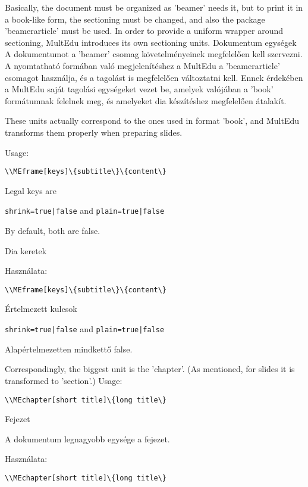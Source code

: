 



{
Basically, the document must be organized as 'beamer' needs it,
but to print it in a book-like form, the sectioning must be changed,
and also the package 'beamerarticle' must be used.
In order to provide a uniform wrapper around sectioning, MultEdu introduces
its own sectioning units.
}
{Dokumentum egységek}
{
A dokumentumot a 'beamer' csomag követelményeinek megfelelően kell szervezni.
A nyomtatható formában való megjelenítéshez a MultEdu  a 'beamerarticle' csomagot használja,
és a tagolást is megfelelően változtatni kell.
Ennek érdekében a MultEdu saját tagolási egységeket vezet be, amelyek valójában
a 'book' formátumnak felelnek meg, és amelyeket dia készítéshez megfelelően átalakít.
}

{
These units actually correspond to the ones used in format 'book',
and MultEdu transforms them properly when preparing slides.

Usage:\par
\noindent\lstinline|\\MEframe[keys]\{subtitle\}\{content\}|

Legal keys are 

\noindent\lstinline!shrink=true|false! and \lstinline!plain=true|false!

By default, both are false.
}
{Dia keretek}
{

Használata:\par
\noindent\lstinline|\\MEframe[keys]\{subtitle\}\{content\}|

Értelmezett kulcsok 

\noindent\lstinline!shrink=true|false! and \lstinline!plain=true|false!

Alapértelmezetten mindkettő false.
}


{
Correspondingly, the biggest unit is the 'chapter'.
(As mentioned, for slides it is transformed to 'section'.)
Usage:\par
\noindent\lstinline|\\MEchapter[short title]\{long title\}|

}
{Fejezet}
{

A dokumentum legnagyobb egysége a fejezet.

Használata:\par
\noindent\lstinline|\\MEchapter[short title]\{long title\}|

}

